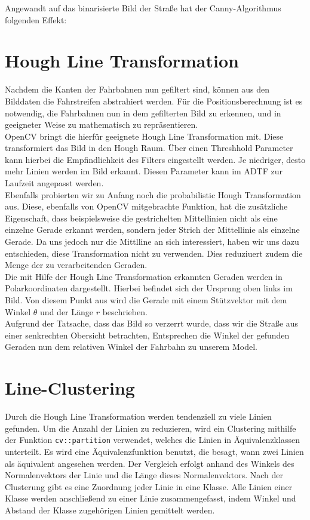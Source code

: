 \documentclass[a4paper,12pt]{report}
\begin{document}
	Angewandt auf das binarisierte Bild der Straße hat der Canny-Algorithmus folgenden Effekt:
	

\section{Hough Line Transformation}
	Nachdem die Kanten der Fahrbahnen nun gefiltert sind, können aus den Bilddaten die Fahrstreifen abstrahiert werden. Für die Positionsberechnung ist es notwendig, die Fahrbahnen nun in dem gefilterten Bild zu erkennen, und in geeigneter Weise zu mathematisch zu repräsentieren. \\
	OpenCV bringt die hierfür geeignete Hough Line Transformation mit. Diese transformiert das Bild in den Hough Raum. Über einen Threshhold Parameter kann hierbei die Empfindlichkeit des Filters eingestellt werden. Je niedriger, desto mehr Linien werden im Bild erkannt. Diesen Parameter kann im ADTF zur Laufzeit angepasst werden.\\
	Ebenfalls probierten wir zu Anfang noch die probabilistic Hough Transformation aus. Diese, ebenfalls von OpenCV mitgebrachte Funktion, hat die zusätzliche Eigenschaft, dass beispielsweise die gestrichelten Mittellinien nicht als eine einzelne Gerade erkannt werden, sondern jeder Strich der Mittellinie als einzelne Gerade. Da uns jedoch nur die Mittlline an sich interessiert, haben wir uns dazu entschieden, diese Transformation nicht zu verwenden. Dies reduziuert zudem die Menge der zu verarbeitenden Geraden.\\
	Die mit Hilfe der Hough Line Transformation erkannten Geraden werden in Polarkoordinaten dargestellt. Hierbei befindet sich der Ursprung oben links im Bild. Von diesem Punkt aus wird die Gerade mit einem Stützvektor mit dem Winkel $\theta$ und der Länge $r$ beschrieben.\\
	Aufgrund der Tatsache, dass das Bild so verzerrt wurde, dass wir die Straße aus einer senkrechten Obersicht betrachten, Entsprechen die Winkel der gefunden Geraden nun dem relativen Winkel der Fahrbahn zu unserem Model.
	
\section{Line-Clustering}
	Durch die Hough Line Transformation werden tendenziell zu viele Linien gefunden. Um die Anzahl der Linien zu reduzieren, wird ein Clustering mithilfe der Funktion \texttt{cv::partition} verwendet, welches die Linien in Äquivalenzklassen unterteilt. Es wird eine Äquivalenzfunktion benutzt, die besagt, wann zwei Linien als äquivalent angesehen werden. Der Vergleich erfolgt anhand des Winkels des Normalenvektors der Linie und die Länge dieses Normalenvektors. Nach der Clusterung gibt es eine Zuordnung jeder Linie in eine Klasse. Alle Linien einer Klasse werden anschließend zu einer Linie zusammengefasst, indem Winkel und Abstand der Klasse zugehörigen Linien gemittelt werden.
\end{document}
